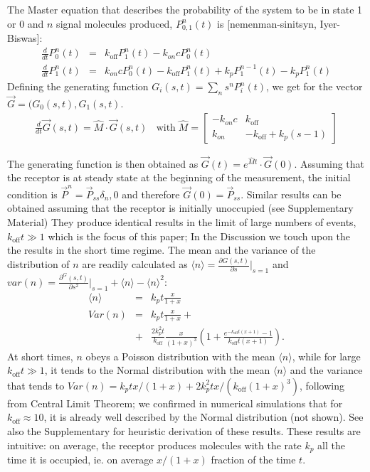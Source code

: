 \documentclass[prl,showpacs]{revtex4}
\begin{document}
The Master equation that describes the probability of the system to be in state 1 or 0 and $n$ signal molecules produced, $P_{0,1}^n(t)$ is [nemenman-sinitsyn, Iyer-Biswas]:
%
\begin{eqnarray}
\frac{d}{dt}P_0^n(t)&=&k_{\text{off}}P_1^n(t)-k_{on}c P_0^n(t)\\
\frac{d}{dt}P_1^n(t)&=&k_{on}cP_0^n(t)-k_{\text{off}} P_1^n(t)+k_pP_1^{n-1}(t)- k_p P_1^n(t)
\end{eqnarray}
%
Defining the generating function $G_i(s,t)=\sum_n s^n P_i^n(t)$, we get for the vector $\vec{G}=(G_0(s,t),G_1(s,t)$.
%
\begin{eqnarray}
\frac{d}{dt}\vec{G}(s,t)=\hat{M}\cdot\vec{G}(s,t)\;\;\text{ with}\; \hat{M}=\begin{bmatrix}-k_{on}c &k_{\text{off}}\\k_{on}& -k_{\text{off}}+k_p(s-1)\end{bmatrix}
\end{eqnarray}

The generating function is then obtained as $\vec{G}(t)=e^{\hat{M}t}\cdot \vec{G}(0)$. Assuming that the receptor is at steady state at the beginning of the measurement, the initial condition is $\vec{P}^n=\vec{P}_{ss}\delta_n,0$ and therefore $\vec{G}(0)=\vec{P}_{ss}$. Similar results can be obtained assuming that the receptor is initially unoccupied (see Supplementary Material) They produce identical results in the limit of large numbers of events, $k_{\text{off}}t\gg 1$ which is the focus of this paper; In the Discussion we touch upon the the results in the short time regime. The mean and the variance of the distribution of $n$ are readily calculated as $\langle n\rangle=\frac{\partial G(s,t)}{\partial s}|_{s=1}$ and
$var(n)=\frac{\partial^ G(s,t)}{\partial s^2}|_{s=1}+\langle n\rangle-\langle n\rangle^2$:
%
\begin{eqnarray}
\langle n\rangle&=&k_pt\frac{x}{1+x}\\
Var(n)&=& k_p t\frac{x}{1+x}+\\
&+& \frac{2k_{p}^2t}{k_{\text{off}}}\frac{x}{(1+x)^3} \left(1+\frac{e^{-k_{\text{off}} t (x+1)}-1}{k_{\text{off}}t(x+1)}\right)\nonumber.
\end{eqnarray}
%
At short times, $n$ obeys a Poisson distribution with the mean $\langle n\rangle$, while for large $k_{\text{off}}t\gg 1$, it tends to  the Normal distribution with the mean  $\langle n\rangle$ and the variance that tends to $Var(n)=k_ptx/(1+x)+2k_{p}^2 t x/(k_{\text{off}}(1+x)^3)$, following from Central Limit Theorem; we confirmed in numerical simulations that for $k_{\text{off}}\approx 10$, it is already well described by the Normal distribution (not shown). See also the Supplementary for heuristic derivation of these results. These results are intuitive: on average, the receptor produces molecules with the rate $k_p$ all the time it is occupied, ie. on average $x/(1+x)$ fraction of the time $t$.
\end{document}
